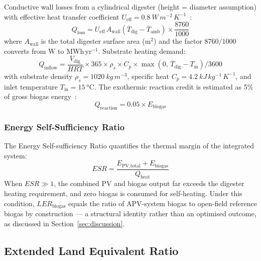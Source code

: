 Conductive wall losses from a cylindrical digester (height = diameter
assumption) with effective heat transfer coefficient
$U_{\text{eff}} = \SI{0.8}{W\,m^{-2}\,K^{-1}}$~\citep{lindorfer2008}:
\begin{equation}
	Q_{\text{loss}} = U_{\text{eff}}\,A_{\text{wall}}
	\left(\overline{T}_{\text{dig}} - \overline{T}_{\text{amb}}\right)
	\times \frac{8760}{1000}
	\label{eq:qloss}
\end{equation}
where $A_{\text{wall}}$ is the total digester surface area (m$^2$)
and the factor $8760/1000$ converts from W to MWh\,yr$^{-1}$.
Substrate heating demand:
\begin{equation}
	Q_{\text{inflow}} = \frac{V_{\text{dig}}}{HRT}
	\times 365 \times \rho_s \times C_p
	\times \max\!\left(0,\,
	\overline{T}_{\text{dig}} - T_{\text{in}}\right)
	/ 3600
	\label{eq:qinflow}
\end{equation}
with substrate density $\rho_s = \SI{1020}{kg\,m^{-3}}$, specific
heat $C_p = \SI{4.2}{kJ\,kg^{-1}\,K^{-1}}$, and inlet temperature
$T_{\text{in}} = \SI{15}{\celsius}$. The exothermic reaction credit
is estimated as 5\% of gross biogas energy~\citep{pal2024}:
\begin{equation}
	Q_{\text{reaction}} = 0.05 \times E_{\text{biogas}}
	\label{eq:qreaction}
\end{equation}

\subsubsection{Energy Self-Sufficiency Ratio}

\hspace{1cm}The Energy Self-sufficiency Ratio quantifies the thermal
margin of the integrated system:
\begin{equation}
	ESR = \frac{E_{\text{PV,total}} + E_{\text{biogas}}}
	{Q_{\text{heat}}}
	\label{eq:esr}
\end{equation}
When $ESR \gg 1$, the combined PV and biogas output far exceeds
the digester heating requirement, and zero biogas is consumed for
self-heating. Under this condition, $LER_{\text{biogas}}$ equals
the ratio of APV-system biogas to open-field reference biogas
by construction --- a structural identity rather than an optimised
outcome, as discussed in Section~\ref{sec:discussion}.

\subsection{Extended Land Equivalent Ratio}
\label{sec:eler}

